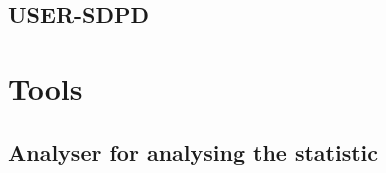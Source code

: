 \documentclass[a4paper,10pt]{scrreprt}
\begin{document}
\section{USER-SDPD}



% 

\chapter{Tools}

\section{Analyser for analysing the statistic}
\end{document}
